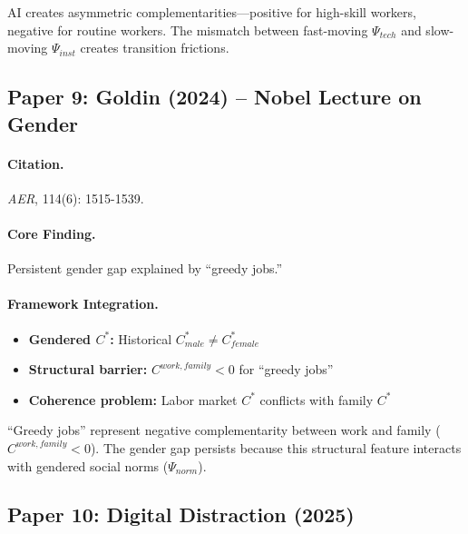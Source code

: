 \begin{tcolorbox}[colback=yellow!5!white, colframe=yellow!75!black,
    title=EBF Insight: AI and Inequality]
AI creates asymmetric complementarities---positive for high-skill workers,
negative for routine workers. The mismatch between fast-moving $\Psi_{tech}$
and slow-moving $\Psi_{inst}$ creates transition frictions.
\end{tcolorbox}


\subsection{Paper 9: Goldin (2024) -- Nobel Lecture on Gender}

\paragraph{Citation.}
\emph{AER}, 114(6): 1515-1539.

\paragraph{Core Finding.}
Persistent gender gap explained by ``greedy jobs.''

\paragraph{Framework Integration.}
\begin{itemize}
  \item \textbf{Gendered $C^*$:} Historical $C^*_{male} \neq C^*_{female}$
  \item \textbf{Structural barrier:} $C^{work,family} < 0$ for ``greedy jobs''
  \item \textbf{Coherence problem:} Labor market $C^*$ conflicts with family $C^*$
\end{itemize}

\begin{tcolorbox}[colback=yellow!5!white, colframe=yellow!75!black,
    title=EBF Insight: Gender Economics]
``Greedy jobs'' represent negative complementarity between work and family
($C^{work,family} < 0$). The gender gap persists because this structural
feature interacts with gendered social norms ($\Psi_{norm}$).
\end{tcolorbox}


\subsection{Paper 10: Digital Distraction (2025)}

